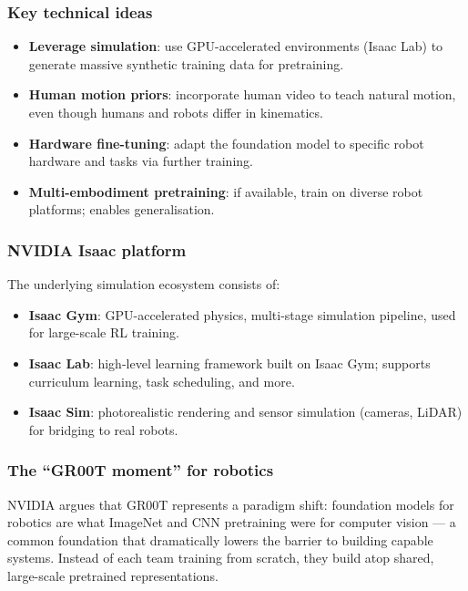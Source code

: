 \subsubsection{Key technical ideas}

\begin{itemize}
\item \textbf{Leverage simulation}: use GPU-accelerated environments (Isaac Lab) to generate massive synthetic training data for pretraining.
\item \textbf{Human motion priors}: incorporate human video to teach natural motion, even though humans and robots differ in kinematics.
\item \textbf{Hardware fine-tuning}: adapt the foundation model to specific robot hardware and tasks via further training.
\item \textbf{Multi-embodiment pretraining}: if available, train on diverse robot platforms; enables generalisation.
\end{itemize}

\subsubsection{NVIDIA Isaac platform}

The underlying simulation ecosystem consists of:
\begin{itemize}
\item \textbf{Isaac Gym}: GPU-accelerated physics, multi-stage simulation pipeline, used for large-scale RL training.
\item \textbf{Isaac Lab}: high-level learning framework built on Isaac Gym; supports curriculum learning, task scheduling, and more.
\item \textbf{Isaac Sim}: photorealistic rendering and sensor simulation (cameras, LiDAR) for bridging to real robots.
\end{itemize}

\subsubsection{The ``GR00T moment'' for robotics}

NVIDIA argues that GR00T represents a paradigm shift: foundation models for robotics are what ImageNet and CNN pretraining were for computer vision — a common foundation that dramatically lowers the barrier to building capable systems. Instead of each team training from scratch, they build atop shared, large-scale pretrained representations.

